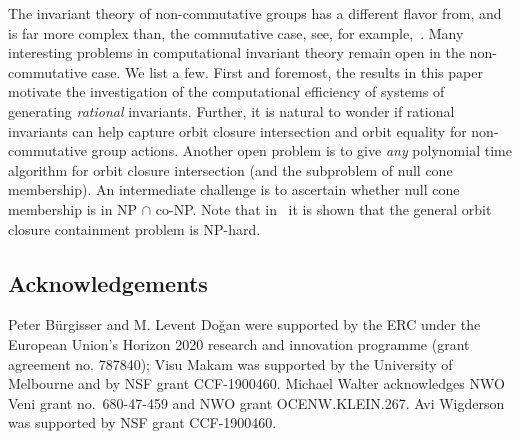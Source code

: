 \documentclass[10pt,a4paper]{article}
\theoremstyle{definition}
\numberwithin{equation}{section}
\begin{document}
The invariant theory of non-commutative groups has a different flavor from, and is far more complex than, the commutative case, see, for example,~\cite{Humphreys:75}.
Many interesting problems in computational invariant theory remain open in the non-commutative case.
We list a few.
First and foremost, the results in this paper motivate the investigation of the computational efficiency of systems of generating \emph{rational} invariants.
Further, it is natural to wonder if rational invariants can help capture orbit closure intersection and orbit equality for non-commutative group actions.
Another open problem is to give \emph{any} polynomial time algorithm for orbit closure intersection (and the subproblem of null cone membership).
An intermediate challenge is to ascertain whether null cone membership is in NP $\cap$ co-NP.
Note that in~\cite{BILPS:20} it is shown that the general orbit closure containment problem is NP-hard.


%
\subsection*{Acknowledgements}
%
Peter B\"urgisser and M. Levent Do\u{g}an were supported by the ERC under the European Union's Horizon 2020 research and innovation programme (grant agreement no. 787840);
Visu Makam was supported by the University of Melbourne and by NSF grant CCF-1900460.
Michael Walter acknowledges NWO Veni grant no.~680-47-459 and NWO grant OCENW.KLEIN.267.
Avi Wigderson was supported by NSF grant CCF-1900460.
\end{document}
